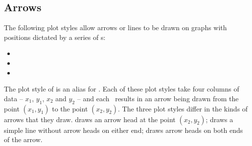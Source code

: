\subsection{Arrows}

The following plot styles allow arrows or lines to be drawn on graphs with
positions dictated by a series of \datapoint s:
\begin{itemize}
\item {}
\item {}
\item {}
\end{itemize}
The plot style of  is an alias for .  Each
of these plot styles take four columns of data -- $x_1$, $y_1$, $x_2$ and $y_2$
-- and each \datapoint\ results in an arrow being drawn from the point
$(x_1,y_1)$ to the point $(x_2,y_2)$. The three plot styles differ in the kinds
of arrows that they draw.  draws an arrow head at the
point $(x_2,y_2)$;  draws a simple line without arrow
heads on either end;  draws arrow heads on both ends of
the arrow.


